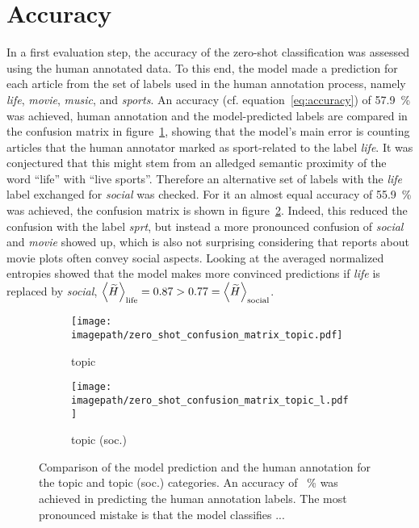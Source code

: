 \section{Accuracy}\label{ch:supervised_accuracy}
In a first evaluation step, the accuracy of the zero-shot classification was assessed using the human annotated data. To this end, the model made a prediction for each article from the set of labels used in the human annotation process, namely \textit{life}, \textit{movie}, \textit{music}, and \textit{sports}. An accuracy (cf. equation~\eqref{eq:accuracy}) of \SI{57.9}{\percent} was achieved, human annotation and the model-predicted labels are compared in the confusion matrix in figure~\ref{fig:zero_shot_confusion_matrix_topic}, showing that the model's main error is counting articles that the human annotator marked as sport-related to the label \textit{life}. It was conjectured that this might stem from an alledged semantic proximity of the word ``life'' with ``live sports''. Therefore an alternative set of labels with the \textit{life} label exchanged for \textit{social} was checked. For it an almost equal accuracy of \SI{55.9}{\percent} was achieved, the confusion matrix is shown in figure~\ref{fig:zero_shot_confusion_matrix_topic_l}. Indeed, this reduced the confusion with the label \textit{sprt}, but instead a more pronounced confusion of \textit{social} and \textit{movie} showed up, which is also not surprising considering that reports about movie plots often convey social aspects. Looking at the averaged normalized entropies showed that the model makes more convinced predictions if \textit{life} is replaced by \textit{social}, $\Braket{\widetilde{H}}_\text{life} = 0.87 > 0.77 = \Braket{\widetilde{H}}_\text{social}$.

\begin{figure}
    \centering
    \begin{subfigure}{0.48\textwidth}
        \centering
        \texttt{[image: \\imagepath/zero\_shot\_confusion\_matrix\_topic.pdf]}
        \caption{topic}\label{fig:zero_shot_confusion_matrix_topic}
    \end{subfigure}
    \hspace{0.03\textwidth}
    \begin{subfigure}{0.48\textwidth}
        \centering
        \texttt{[image: \\imagepath/zero\_shot\_confusion\_matrix\_topic\_l.pdf]}
        \caption{topic (soc.)}\label{fig:zero_shot_confusion_matrix_topic_l}
    \end{subfigure}
    \caption{Comparison of the model prediction and the human annotation for the topic and topic (soc.) categories. An accuracy of \SI{}{\percent} was achieved in predicting the human annotation labels. The most pronounced mistake is that the model classifies ...}\label{fig:zero_shot_confusion_matrices}
\end{figure}

